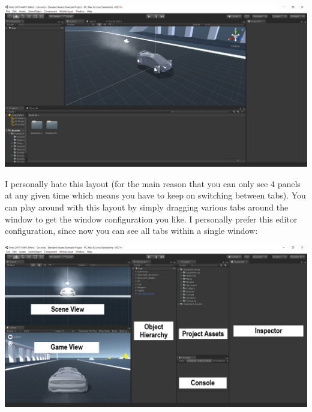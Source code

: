 \documentclass{article}[a4paper,12pt]
\theoremstyle{definition}
\begin{document}
\includegraphics[width=\textwidth]{unity_default_layout.png}
\vspace{1pt}

I personally hate this layout (for the main reason that you can only see 4 panels at any given time which means you have to keep on switching between tabs). You can play around with this layout by simply dragging various tabs around the window to get the window configuration you like. I personally prefer this editor configuration, since now you can see all tabs within a single window:

\includegraphics[width=\textwidth]{unity_custom_layout.png}
\vspace{1pt}
\end{document}
